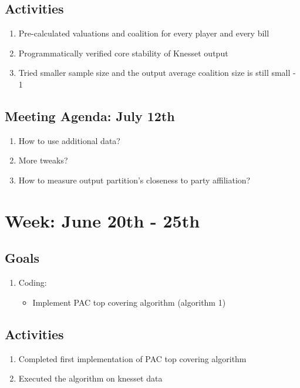 \documentclass[a4paper]{article}
\begin{document}
\subsection*{Activities}

\begin{enumerate}
  \item Pre-calculated valuations and coalition for every player and every bill
  \item Programmatically verified core stability of Knesset output
  \item Tried smaller sample size and the output average coalition size is still small - 1
\end{enumerate}

\subsection*{Meeting Agenda: July 12th}

\begin{enumerate}
  \item How to use additional data?
  \item More tweaks?
  \item How to measure output partition's closeness to party affiliation?
\end{enumerate}

\section*{Week: June 20th - 25th}

\subsection*{Goals}

\begin{enumerate}
  \item Coding:
  \begin{itemize}
    \item Implement PAC top covering algorithm (algorithm 1)
  \end{itemize}
\end{enumerate}

\subsection*{Activities}

\begin{enumerate}
  \item Completed first implementation of PAC top covering algorithm
  \item Executed the algorithm on knesset data
\end{enumerate}
\end{document}
